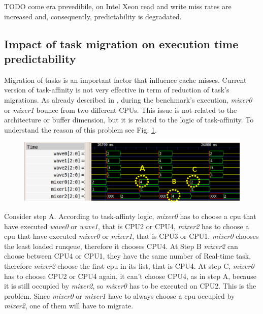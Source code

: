 TODO come era prevedibile, on Intel Xeon read and write miss rates are increased and, consequently, predictability is degradated.

\subsection{Impact of task migration on execution time predictability}

Migration of tasks is an important factor that influence cache misses. Current version of task-affinity is not very effective in term of reduction of 
task's migrations. As already described in \cite{lcs}, during the benchmark's execution, \textit{mixer0} or \textit{mixer1} bounce from two different CPUs. 
This issue is not related to the architecture or buffer dimension, but it is related to the logic of task-affinity. To understand the reason of this 
problem see Fig. \ref{fig:migr_pat}.

\begin{figure}[h]
\centering
\includegraphics[width=\widefigure]{images/migr_i7.eps}
\caption{}
\label{fig:migr_pat}
\end{figure}

Consider step A. According to task-affinty logic, \textit{mixer0} has to choose a cpu that have executed \textit{wave0} or \textit{wave1}, that is
CPU2 or CPU4, \textit{mixer2} has to choose a cpu that have executed \textit{mixer0} or \textit{mixer1}, that is CPU3 or CPU1. \textit{mixer0} chooses the 
least loaded runqeue, therefore it chooses CPU4. At Step B \textit{mixer2} can choose between CPU4 or CPU1, they have the same number of Real-time task, 
therefore \textit{mixer2} choose the first cpu in its list, that is CPU4. At step C, \textit{mixer0} has to choose CPU2 or CPU4 again, it can't choose CPU4,
as in step A, because it is still occupied by \textit{mixer2}, so \textit{mixer0} has to be executed on CPU2. This is the problem. Since \textit{mixer0} or 
\textit{mixer1} have to always choose a cpu occupied by \textit{mixer2}, one of them will have to migrate.

